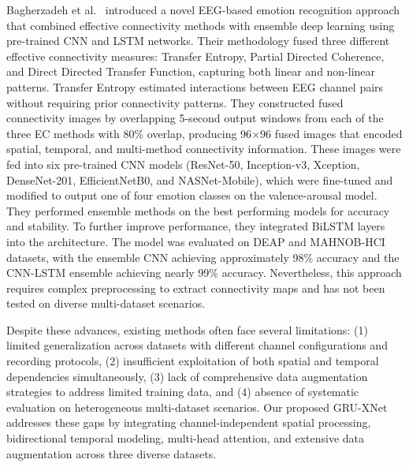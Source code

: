 \documentclass[conference]{IEEEtran}
\begin{document}
Bagherzadeh et al.~\cite{bagherzadeh2024developing} introduced a novel EEG-based emotion recognition approach that combined effective connectivity methods with ensemble deep learning using pre-trained CNN and LSTM networks. Their methodology fused three different effective connectivity measures: Transfer Entropy, Partial Directed Coherence, and Direct Directed Transfer Function, capturing both linear and non-linear patterns. Transfer Entropy estimated interactions between EEG channel pairs without requiring prior connectivity patterns. They constructed fused connectivity images by overlapping 5-second output windows from each of the three EC methods with 80\% overlap, producing 96$\times$96 fused images that encoded spatial, temporal, and multi-method connectivity information. These images were fed into six pre-trained CNN models (ResNet-50, Inception-v3, Xception, DenseNet-201, EfficientNetB0, and NASNet-Mobile), which were fine-tuned and modified to output one of four emotion classes on the valence-arousal model. They performed ensemble methods on the best performing models for accuracy and stability. To further improve performance, they integrated BiLSTM layers into the architecture. The model was evaluated on DEAP and MAHNOB-HCI datasets, with the ensemble CNN achieving approximately 98\% accuracy and the CNN-LSTM ensemble achieving nearly 99\% accuracy. Nevertheless, this approach requires complex preprocessing to extract connectivity maps and has not been tested on diverse multi-dataset scenarios.

Despite these advances, existing methods often face several limitations: (1) limited generalization across datasets with different channel configurations and recording protocols, (2) insufficient exploitation of both spatial and temporal dependencies simultaneously, (3) lack of comprehensive data augmentation strategies to address limited training data, and (4) absence of systematic evaluation on heterogeneous multi-dataset scenarios. Our proposed GRU-XNet addresses these gaps by integrating channel-independent spatial processing, bidirectional temporal modeling, multi-head attention, and extensive data augmentation across three diverse datasets.


\end{document}
